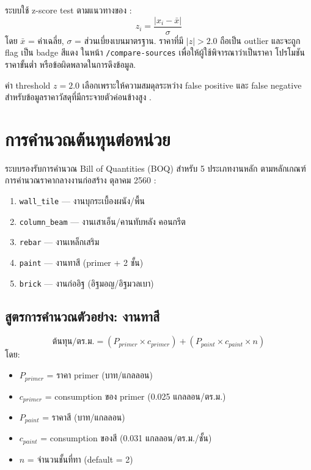 ระบบใช้ z-score test ตามแนวทางของ \textcite{lee2024}:
\begin{equation}
z_i = \frac{|x_i - \bar{x}|}{\sigma}
\end{equation}
โดย $\bar{x}$ = ค่าเฉลี่ย, $\sigma$ = ส่วนเบี่ยงเบนมาตรฐาน.
ราคาที่มี $|z| > 2.0$ ถือเป็น outlier และจะถูก flag เป็น badge สีแดง
ในหน้า \texttt{/compare-sources} เพื่อให้ผู้ใช้พิจารณาว่าเป็นราคา
โปรโมชัน ราคาขั้นต่ำ หรือข้อผิดพลาดในการดึงข้อมูล.

ค่า threshold $z = 2.0$ เลือกเพราะให้ความสมดุลระหว่าง false positive
และ false negative สำหรับข้อมูลราคาวัสดุที่มีกระจายตัวค่อนข้างสูง
\cite{lee2024}.



\section{การคำนวณต้นทุนต่อหน่วย}
\label{sec:boq}

ระบบรองรับการคำนวณ Bill of Quantities (BOQ) สำหรับ 5 ประเภทงานหลัก
ตามหลักเกณฑ์การคำนวณราคากลางงานก่อสร้าง ตุลาคม 2560 \cite{cgd2569}:

\begin{enumerate}[leftmargin=2em,itemsep=0.2em]
  \item \texttt{wall\_tile} — งานบุกระเบื้องผนัง/พื้น
  \item \texttt{column\_beam} — งานเสาเอ็น/คานทับหลัง คอนกรีต
  \item \texttt{rebar} — งานเหล็กเสริม
  \item \texttt{paint} — งานทาสี (primer + 2 ชั้น)
  \item \texttt{brick} — งานก่ออิฐ (อิฐมอญ/อิฐมวลเบา)
\end{enumerate}

\subsection{สูตรการคำนวณตัวอย่าง: งานทาสี}

\begin{equation}
\text{ต้นทุน/ตร.ม.} = (P_{primer} \times c_{primer}) + (P_{paint} \times c_{paint} \times n)
\end{equation}
โดย:
\begin{itemize}[leftmargin=2em,itemsep=0.1em]
  \item $P_{primer}$ = ราคา primer (บาท/แกลลอน)
  \item $c_{primer}$ = consumption ของ primer (0.025 แกลลอน/ตร.ม.)
  \item $P_{paint}$ = ราคาสี (บาท/แกลลอน)
  \item $c_{paint}$ = consumption ของสี (0.031 แกลลอน/ตร.ม./ชั้น)
  \item $n$ = จำนวนชั้นที่ทา (default = 2)
\end{itemize}

